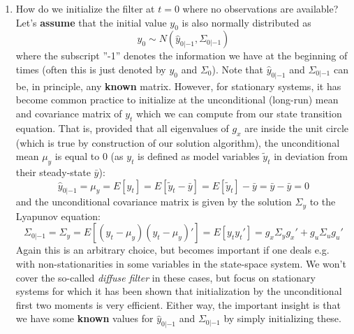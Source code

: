 \begin{enumerate}
	\item How do we initialize the filter at $t=0$ where no observations are available? Let's \textbf{assume} that the initial value $y_0$ is also normally distributed as
	$$y_0 \sim N(\hat{y}_{0|-1},\Sigma_{0|-1})$$
	where the subscript ''-1'' denotes the information we have at the beginning of times (often this is just denoted by $y_0$ and $\Sigma_0$). Note that $\hat{y}_{0|-1}$ and $\Sigma_{0|-1}$ can be, in principle, any \textbf{known} matrix. However, for stationary systems, it has become common practice to initialize at the unconditional (long-run) mean and covariance matrix of $y_t$ which we can compute from our state transition equation. That is, provided that all eigenvalues of $g_x$ are inside the unit circle (which is true by construction of our solution algorithm), the unconditional mean $\mu_y$ is equal to 0 (as $y_t$ is defined as model variables $\tilde{y}_t$ in deviation from their steady-state $\bar{y}$):
	$$\hat{y}_{0|-1} = \mu_y = E[y_t] = E[\tilde{y}_t - \bar{y}] = E[\tilde{y}_t] - \bar{y} = \bar{y} - \bar{y} = 0$$
	and the unconditional covariance matrix is given by the solution $\Sigma_y$ to the Lyapunov equation:
	$$\Sigma_{0|-1} = \Sigma_y = E[(y_t-\mu_y)(y_t-\mu_y)'] = E[y_t y_t'] = g_x \Sigma_y g_x' + g_u \Sigma_u g_u'$$
	Again this is an arbitrary choice, but becomes important if one deals e.g. with non-stationarities in some variables in the state-space system. We won't cover the so-called \emph{diffuse filter} in these cases, but focus on stationary systems for which it has been shown that initialization by the unconditional first two moments is very efficient. Either way, the important insight is that we have some \textbf{known} values for $\hat{y}_{0|-1}$ and $\Sigma_{0|-1}$ by simply initializing these.


\end{enumerate}
